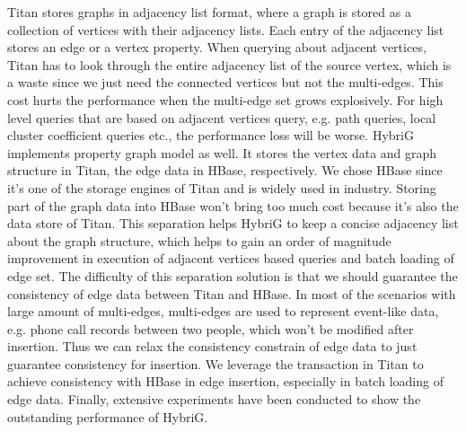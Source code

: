 \begin{eabstract}
	Titan stores graphs in adjacency list format, where a graph is stored as a collection of vertices with their adjacency lists. Each entry of the adjacency list stores an edge or a vertex property. When querying about adjacent vertices, Titan has to look through the entire adjacency list of the source vertex, which is a waste since we just need the connected vertices but not the multi-edges. This cost hurts the performance when the multi-edge set grows explosively. For high level queries that are based on adjacent vertices query, e.g. path queries, local cluster coefficient queries etc., the performance loss will be worse. 
	HybriG implements property graph model as well. It stores the vertex data and graph structure in Titan, the edge data in HBase, respectively. We chose HBase since it’s one of the storage engines of Titan and is widely used in industry. Storing part of the graph data into HBase won’t bring too much cost because it’s also the data store of Titan. This separation helps HybriG to keep a concise adjacency list about the graph structure, which helps to gain an order of magnitude improvement in execution of adjacent vertices based queries and batch loading of edge set. The difficulty of this separation solution is that we should guarantee the consistency of edge data between Titan and HBase. In most of the scenarios with large amount of multi-edges, multi-edges are used to represent event-like data, e.g. phone call records between two people, which won’t be modified after insertion. Thus we can relax the consistency constrain of edge data to just guarantee consistency for insertion. We leverage the transaction in Titan to achieve consistency with HBase in edge insertion, especially in batch loading of edge data. Finally, extensive experiments have been conducted to show the outstanding performance of HybriG.
\end{eabstract}


